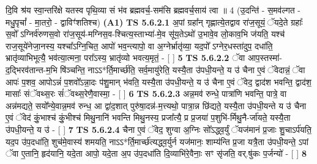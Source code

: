 \documentclass[17pt]{extarticle}
\begin{document}
                      दि॒वि श्र॑य स्वा॒न्तरि॑क्षे यतस्व पृथि॒व्या सं भ॑व ब्रह्मवर्च॒-सम॑सि ब्रह्मवर्च॒साय॑ त्वा ॥ 4 (उ॒दन्ति॑ - स॒मव॑ल्गत - मधु॒पृचां᳚ - मा॒तरो॒ - द्वाविꣳ॑शतिश्च)  \textbf{(A1)} \newline \newline
                                        \textbf{ TS 5.6.2.1} \newline
                  अ॒पां ग्रहा᳚न् गृह्णात्ये॒तद्वाव रा॑ज॒सूयं॒ ॅयदे॒ते ग्रहाः᳚ स॒वो᳚ ऽग्निर्व॑रुणस॒वो रा॑ज॒सूय॑-मग्निस॒व-श्चित्य॒स्ताभ्या॑-मे॒व सू॑य॒तेऽथो॑ उ॒भावे॒व लो॒काव॒भि ज॑यति॒ यश्च॑ राज॒सूये॑नेजा॒नस्य॒ यश्चा᳚ऽग्नि॒चित॒ आपो॑ भव॒न्त्यापो॒ वा अ॒ग्नेर्भ्रातृ॑व्या॒ यद॒पो᳚ ऽग्नेर॒धस्ता॑दुप॒ दधा॑ति॒ भ्रातृ॑व्याभिभूत्यै॒ भव॑त्या॒त्मना॒ परा᳚ऽस्य॒ भ्रातृ॑व्यो भवत्य॒मृतं॒ - [  ] \textbf{  5} \newline
                  \newline
                                \textbf{ TS 5.6.2.2} \newline
                  ॅवा आप॒स्तस्मा॑-द॒द्भिरव॑तान्त-म॒भि षि॑ञ्चन्ति॒ नाऽऽ*र्ति॒मार्च्छ॑ति॒ सर्व॒मायु॑रेति॒ यस्यै॒ता उ॑पधी॒यन्ते॒ य उ॑ चैना ए॒वं ॅवेदान्नं॒ ॅवा आपः॑ प॒शव॒ आपोऽन्नं॑ प॒शवो᳚ऽन्ना॒दः प॑शु॒मान् भ॑वति॒ यस्यै॒ता उ॑पधी॒यन्ते॒ य उ॑ चैना ए॒वं ॅवेद॒ द्वाद॑श भवन्ति॒ द्वाद॑श॒ मासाः᳚ संॅवथ्स॒रः सं॑ॅवथ्स॒रेणै॒वास्मा॒ - [  ] \textbf{  6} \newline
                  \newline
                                \textbf{ TS 5.6.2.3} \newline
                  अन्न॒मव॑ रुन्धे॒ पात्रा॑णि भवन्ति॒ पात्रे॒ वा अन्न॑मद्यते॒ सयो᳚न्ये॒वान्न॒मव॑ रुन्ध॒ आ द्वा॑द॒शात् पुरु॑षा॒दन्न॑-म॒त्त्यथो॒ पात्रा॒न्न छि॑द्यते॒ यस्यै॒ता उ॑पधी॒यन्ते य उ॑ चैना ए॒वं ॅवेद॑ कुं॒भाश्च॑ कुं॒भीश्च॑ मिथु॒नानि॑ भवन्ति मिथु॒नस्य॒ प्रजा᳚त्यै॒ प्र प्र॒जया॑ प॒शुभि॑-र्मिथु॒नै-र्जा॑यते॒ यस्यै॒ता उ॑पधी॒यन्ते॒ य उ॑ - [  ] \textbf{  7} \newline
                  \newline
                                \textbf{ TS 5.6.2.4} \newline
                  चैना ए॒वं ॅवेद॒ शुग्वा अ॒ग्निः सो᳚ऽद्ध्व॒र्युं ॅयज॑मानं प्र॒जाः शु॒चाऽर्प॑यति॒ यद॒प उ॑प॒दधा॑ति॒ शुच॑मे॒वास्य॑ शमयति॒ नाऽऽ*र्ति॒मार्च्छ॑त्यद्ध्व॒र्युर्न यज॑मानः॒ शाम्य॑न्ति प्र॒जा यत्रै॒ता उ॑पधी॒यन्ते॒ ऽपां ॅवा ए॒तानि॒ हृद॑यानि॒ यदे॒ता आपो॒ यदे॒ता अ॒प उ॑प॒दधा॑ति दि॒व्याभि॑रे॒वैनाः॒ सꣳ सृ॑जति॒ वर्.षु॑कः प॒र्जन्यो॑ - [  ] \textbf{  8} \newline
                  \newline
\end{document}
